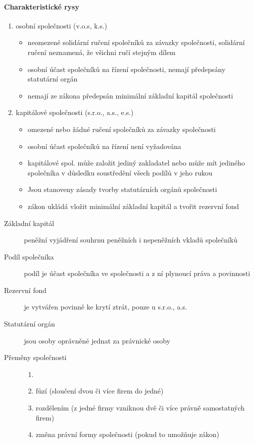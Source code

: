\documentclass[11pt,a4paper,twoside]{book}
\begin{document}
	\paragraph*{Charakteristické rysy}
	\begin{enumerate}
		\item osobní společnosti (v.o.s, k.s.)
			\begin{itemize}
				\item neomezené solidární ručení společníků za závazky společnosti, solidární ručení neznamená, že všichni ručí stejným dílem
				\item osobní účast společníků na řízení společnosti, nemají předepsány statutární orgán
				\item nemají ze zákona předepsán minimální základní kapitál společnosti
			\end{itemize}
		\item kapitálové společnosti (s.r.o., a.s., e.s.)
			\begin{itemize}
				\item omezené nebo žádné ručení společníků za závazky společnosti
				\item osobní účast společníků na řízení není vyžadována
				\item kapitálové spol. může založit jediný zakladatel nebo může mít jediného společníka v důsledku soustředění všech podílů v jeho rukou
				\item Jsou stanoveny zásady tvorby statutárních orgánů společnosti
				\item zákon ukládá vložit minimální základní kapitál a tvořit rezervní fond
			\end{itemize}
	\end{enumerate}

	\begin{description}
		\item[Základní kapitál] peněžní vyjádření souhrnu peněžních i nepeněžních vkladů společníků
		\item[Podíl společníka] podíl je účast společníka ve společnosti a z ní plynoucí práva a povinnosti
		\item[Rezervní fond] je vytvářen povinně ke krytí ztrát, pouze u s.r.o., a.s.
		\item[Statutární orgán] jsou osoby oprávněné jednat za právnické osoby
		\item[Přeměny společnosti]
			\begin{enumerate}[label=(\alph*)]
				\item []
				\item fůzí (sloučení dvou či více firem do jedné)
				\item rozdělením (z jedné firmy vzniknou dvě či více právně samostatných firem)
				\item změna právní formy společnosti (pokud to umožňuje zákon)	
			\end{enumerate}
	\end{description}
\end{document}
